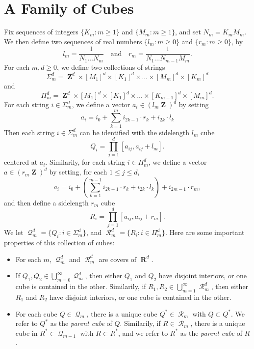 \documentclass[12pt,reqno]{article}
\DeclareMathOperator{\RR}{\mathbf{R}}
\DeclareMathOperator{\ZZ}{\mathbf{Z}}
\DeclareMathOperator{\DQ}{\mathcal{Q}}
\DeclareMathOperator{\DR}{\mathcal{R}}
\begin{document}
\section{A Family of Cubes}

Fix sequences of integers $\{ K_m : m \geq 1 \}$ and $\{ M_m : m \geq 1 \}$, and set $N_m = K_m M_m$. We then define two sequences of real numbers $\{ l_m : m \geq 0 \}$ and $\{ r_m : m \geq 0 \}$, by
%
\[ l_m = \frac{1}{N_1 \dots N_m} \quad\text{and}\quad r_m = \frac{1}{N_1 \dots N_{m-1} M_m}. \]
%
For each $m, d \geq 0$, we define two collections of strings
%
\[ \Sigma_m^d = \ZZ^d \times [M_1]^d \times [K_1]^d \times \dots \times [M_m]^d \times [K_m]^d \]
%
and
%
\[ \Pi_m^d = \ZZ^d \times [M_1]^d \times [K_1]^d \times \dots \times [K_{m-1}]^d \times [M_m]^d. \]
%
For each string $i \in \Sigma_m^d$, we define a vector $a_i \in (l_m \ZZ)^d$ by setting
%
\[ a_i = i_0 + \sum_{k = 1}^m i_{2k-1} \cdot r_k + i_{2k} \cdot l_k \]
%
Then each string $i \in \Sigma_m^d$ can be identified with the sidelength $l_m$ cube
%
\[ Q_i = \prod_{j = 1}^d \left[ a_{ij}, a_{ij} + l_m \right]. \]
%
centered at $a_i$. Similarily, for each string $i \in \Pi_m^d$, we define a vector $a \in (r_m \ZZ)^d$ by setting, for each $1 \leq j \leq d$,
%
\[ a_i = i_0 + \left( \sum_{k = 1}^{m-1} i_{2k-1} \cdot r_k + i_{2k} \cdot l_k \right) + i_{2m-1} \cdot r_m, \]
%
and then define a sidelength $r_m$ cube
%
\[ R_i = \prod_{j = 1}^d \left[ a_{ij}, a_{ij} + r_m \right]. \]
%
We let $\DQ_m^d = \{ Q_i : i \in \Sigma_m^d \}$, and $\DR_m^d = \{ R_i : i \in \Pi_m^d \}$. Here are some important properties of this collection of cubes:
%
\begin{itemize}
	\item For each $m$, $\DQ_m^d$ and $\DR_m^d$ are covers of $\RR^d$.

	\item If $Q_1,Q_2 \in \bigcup_{m = 0}^\infty \DQ_m^d$, then either $Q_1$ and $Q_2$ have disjoint interiors, or one cube is contained in the other. Similarily, if $R_1,R_2 \in \bigcup_{m = 1}^\infty \DR_m^d$, then either $R_1$ and $R_2$ have disjoint interiors, or one cube is contained in the other.

	\item For each cube $Q \in \DQ_m$, there is a unique cube $Q^* \in \DR_m$ with $Q \subset Q^*$. We refer to $Q^*$ as the \emph{parent cube} of $Q$. Similarily, if $R \in \DR_m$, there is a unique cube in $R^* \in \DQ_{m-1}$ with $R \subset R^*$, and we refer to $R^*$ as the \emph{parent cube} of $R$.
\end{itemize}
\end{document}
